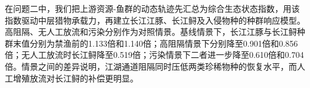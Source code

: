 在问题二中，我们把上游资源-鱼群的动态轨迹先汇总为综合生态状态指数，用该指数驱动中层猎物承载力，再建立长江江豚、长江鲟及入侵物种的种群响应模型。高阻隔、无人工放流和污染分别作为对照情景。基线情景下，长江江豚与长江鲟种群末值分别为禁渔前的1.133倍和1.140倍；高阻隔情景下分别降至0.901倍和0.856倍；无人工放流时长江鲟降至0.519倍；污染情景下二者进一步降至0.610倍和0.704倍。情景之间的差异说明，江湖通道阻隔同时压低两类珍稀物种的恢复水平，而人工增殖放流对长江鲟的补偿更明显。